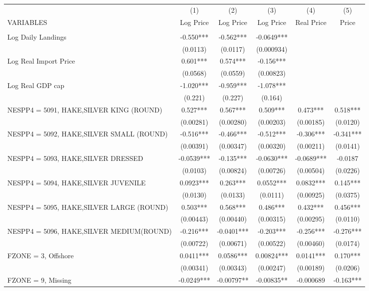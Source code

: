 \begin{tabular}{lccccc} \hline
 & (1) & (2) & (3) & (4) & (5) \\
VARIABLES & Log Price & Log Price & Log Price & Real Price & Price \\ \hline
 &  &  &  &  &  \\
Log Daily Landings & -0.550*** & -0.562*** & -0.0649*** &  &  \\
 & (0.0113) & (0.0117) & (0.000934) &  &  \\
Log Real Import Price & 0.601*** & 0.574*** & -0.156*** &  &  \\
 & (0.0568) & (0.0559) & (0.00823) &  &  \\
Log Real GDP cap & -1.020*** & -0.959*** & -1.078*** &  &  \\
 & (0.221) & (0.227) & (0.164) &  &  \\
NESPP4 = 5091, HAKE,SILVER KING (ROUND) & 0.527*** & 0.567*** & 0.509*** & 0.473*** & 0.518*** \\
 & (0.00281) & (0.00280) & (0.00203) & (0.00185) & (0.0120) \\
NESPP4 = 5092, HAKE,SILVER SMALL (ROUND) & -0.516*** & -0.466*** & -0.512*** & -0.306*** & -0.341*** \\
 & (0.00391) & (0.00347) & (0.00320) & (0.00211) & (0.0141) \\
NESPP4 = 5093, HAKE,SILVER DRESSED & -0.0539*** & -0.135*** & -0.0630*** & -0.0689*** & -0.0187 \\
 & (0.0103) & (0.00824) & (0.00726) & (0.00504) & (0.0226) \\
NESPP4 = 5094, HAKE,SILVER JUVENILE & 0.0923*** & 0.263*** & 0.0552*** & 0.0832*** & 0.145*** \\
 & (0.0130) & (0.0133) & (0.0111) & (0.00925) & (0.0375) \\
NESPP4 = 5095, HAKE,SILVER LARGE (ROUND) & 0.503*** & 0.568*** & 0.486*** & 0.432*** & 0.456*** \\
 & (0.00443) & (0.00440) & (0.00315) & (0.00295) & (0.0110) \\
NESPP4 = 5096, HAKE,SILVER MEDIUM(ROUND) & -0.216*** & -0.0401*** & -0.203*** & -0.256*** & -0.276*** \\
 & (0.00722) & (0.00671) & (0.00522) & (0.00460) & (0.0174) \\
FZONE = 3, Offshore & 0.0411*** & 0.0586*** & 0.00824*** & 0.0141*** & 0.170*** \\
 & (0.00341) & (0.00343) & (0.00247) & (0.00189) & (0.0206) \\
FZONE = 9, Missing & -0.0249*** & -0.00797** & -0.00835** & -0.000689 & -0.163*** \\

\end{tabular}
